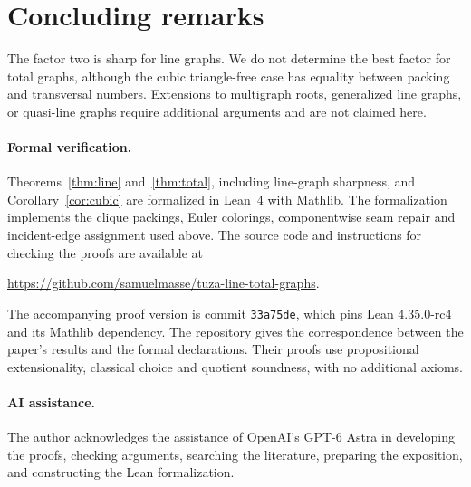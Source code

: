 \documentclass[11pt]{article}
\theoremstyle{remark}
\begin{document}
\section{Concluding remarks}

The factor two is sharp for line graphs.  We do not determine the best
factor for total graphs, although the cubic triangle-free case has equality
between packing and transversal numbers.  Extensions to multigraph roots,
generalized line graphs, or quasi-line graphs require additional arguments
and are not claimed here.

\paragraph{Formal verification.}\label{sec:formal}

Theorems~\ref{thm:line} and~\ref{thm:total}, including line-graph sharpness,
and Corollary~\ref{cor:cubic} are formalized in Lean~4 with Mathlib.
The formalization implements the clique packings, Euler colorings,
componentwise seam repair and incident-edge assignment used above.
The source code and instructions for checking the proofs are available at
\begin{center}
\url{https://github.com/samuelmasse/tuza-line-total-graphs}.
\end{center}
The accompanying proof version is
\href{https://github.com/samuelmasse/tuza-line-total-graphs/tree/33a75de51646668b1058c8d505e0b8d0d16bead4}
{commit \texttt{33a75de}}, which pins Lean 4.35.0-rc4 and its Mathlib dependency.
The repository gives the correspondence between the paper's results and the
formal declarations.  Their proofs use propositional extensionality,
classical choice and quotient soundness, with no additional axioms.

\paragraph{AI assistance.}
The author acknowledges the assistance of OpenAI's GPT-6 Astra in developing
the proofs, checking arguments, searching the literature, preparing the
exposition, and constructing the Lean formalization.

\clearpage

\begingroup
\raggedright

\endgroup
\end{document}
